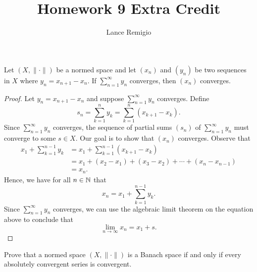 \documentclass[a4paper]{article}
\title{Homework 9 Extra Credit}
\author{Lance Remigio}
\begin{document}
   \maketitle 

   \begin{lemma}\label{lemma}
    Let \( (X,\|\cdot\|) \) be a normed space and let \( ({x}_{n}) \) and \( ({y}_{n}) \) be two sequences in \( X  \) where \( {y}_{n} = {x}_{n+1} - {x}_{n} \).  If \( \sum_{ n=1  }^{ \infty  } {y}_{n} \) converges, then \( ({x}_{n}) \) converges.
\end{lemma}
\begin{proof}
Let \( {y}_{n} = {x}_{n+1} - {x}_{n} \) and suppose \( \sum_{ n=1  }^{ \infty  } {y}_{n} \) converges. Define
\[  {s}_{n} = \sum_{ k=1  }^{ n } {y}_{k} = \sum_{ k=1 }^{ n } ({x}_{k+1} - {x}_{k}). \]
Since \( \sum_{ n=1  }^{ \infty  } {y}_{n} \) converges, the sequence of partial sums \( ({s}_{n}) \) of \( \sum_{ n=1  }^{ \infty  } {y}_{n} \) must converge to some \( s \in X  \). Our goal is to show that \( ({x}_{n}) \) converges. Observe that 
\begin{align*}
    {x}_{1} + \sum_{ k=1  }^{ n - 1  } {y}_{k} &= {x}_{1} + \sum_{ k=1  }^{ n-1  } ({x}_{k+1} - {x}_{k}) \\
                                               &= {x}_{1} + ({x}_{2} - {x}_{1}) + ({x}_{3} - {x}_{2}) + \cdots + ({x}_{n} - {x}_{n-1}) \\
                                               &= {x}_{n}.
\end{align*}
Hence, we have for all \( n \in \mathbb{N}  \) that 
\[  {x}_{n} = {x}_{1} + \sum_{ k=1  }^{ n - 1  } {y}_{k }. \]
Since \( \sum_{ n=1  }^{ \infty  } {y}_{n} \) converges, we can use the algebraic limit theorem on the equation above to conclude that 
\[  \lim_{ n \to \infty  }  {x}_{n} = {x}_{1} + s.  \]

\end{proof}

\begin{problem}
    Prove that a normed space \( (X, \| \cdot \|) \) is a Banach space if and only if every absolutely convergent series is convergent. 
\end{problem}
\end{document}
